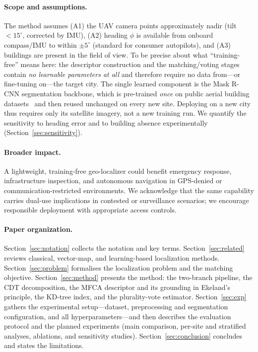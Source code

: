 \documentclass[10pt]{article}
\theoremstyle{plain}
\theoremstyle{definition}
\begin{document}
\paragraph{Scope and assumptions.}
The method assumes (A1) the UAV camera points approximately nadir (tilt
$<15^\circ$, corrected by IMU), (A2) heading $\phi$ is available from onboard
compass/IMU to within $\pm5^\circ$ (standard for consumer autopilots), and
(A3) buildings are present in the field of view.
To be precise about what ``training-free'' means here: the descriptor
construction and the matching/voting stages contain \emph{no learnable
parameters at all} and therefore require no data from---or fine-tuning on---the
target city.
The single learned component is the Mask R-CNN segmentation backbone, which is
pre-trained \emph{once} on public aerial building
datasets~\cite{ji2018building,fang2021building} and then reused unchanged on
every new site.
Deploying on a new city thus requires only its satellite imagery, not a new
training run.
We quantify the sensitivity to heading error and to building absence
experimentally (Section~\ref{sec:sensitivity}).

\paragraph{Broader impact.}
A lightweight, training-free geo-localizer could benefit emergency response,
infrastructure inspection, and autonomous navigation in GPS-denied or
communication-restricted environments.
We acknowledge that the same capability carries dual-use implications in
contested or surveillance scenarios; we encourage responsible deployment with
appropriate access controls.

\paragraph{Paper organization.}
Section~\ref{sec:notation} collects the notation and key terms.
Section~\ref{sec:related} reviews classical, vector-map, and learning-based
localization methods.
Section~\ref{sec:problem} formalises the localization problem and the
matching objective.
Section~\ref{sec:method} presents the method: the two-branch pipeline, the CDT
decomposition, the MFCA descriptor and its grounding in Ekeland's principle,
the KD-tree index, and the plurality-vote estimator.
Section~\ref{sec:exp} gathers the experimental setup---dataset, preprocessing
and segmentation configuration, and all hyperparameters---and then describes the
evaluation protocol and the planned experiments (main comparison, per-site and
stratified analyses, ablations, and sensitivity studies).
Section~\ref{sec:conclusion} concludes and states the limitations.
\end{document}
